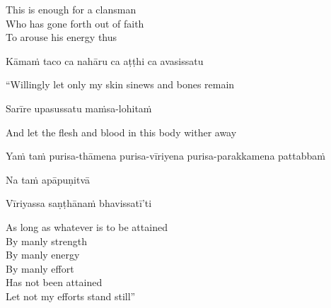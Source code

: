 \begin{english-verses}
  This is enough for a clansman\\
  Who has gone forth out of faith\\
  To arouse his energy thus
\end{english-verses}

Kāmaṁ taco ca nahāru ca aṭṭhi ca avasissatu

\begin{english}
  ``Willingly let only my skin  sinews  and bones remain
\end{english}

Sarīre upasussatu maṁsa-lohitaṁ

\begin{english}
  And let the flesh and blood in this body wither away
\end{english}

\begin{pali-hang}
  Yaṁ taṁ purisa-thāmena purisa-vīriyena purisa-parakkamena pattabbaṁ\\
\end{pali-hang}
\begin{pali-hangtogether}
  Na taṁ apāpuṇitvā\\
\end{pali-hangtogether}
\begin{pali-hangtogether}
  Vīriyassa saṇṭhānaṁ bhavissatī'ti
\end{pali-hangtogether}

\begin{english-verses}
  As long as whatever is to be attained\\
  By manly strength\\
  By manly energy\\
  By manly effort\ifdigitalversion\makeatletter\hyperlink{endnote87-appendix}\makeatother\fi\\
  Has not been attained\\
  Let not my efforts stand still''
\end{english-verses}

